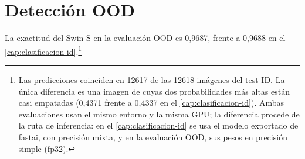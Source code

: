 %

\chapter{Detección OOD}\label{cap:deteccion-ood}


La exactitud del Swin-S en la evaluación OOD es 0,9687, frente a 0,9688 en el \cref{cap:clasificacion-id}.\footnote{Las predicciones coinciden en \num{12617} de las \num{12618} imágenes del test ID. La única diferencia es una imagen de  cuyas dos probabilidades más altas están casi empatadas (0,4371 frente a 0,4337 en el \cref{cap:clasificacion-id}). Ambas evaluaciones usan el mismo entorno y la misma GPU; la diferencia procede de la ruta de inferencia: en el \cref{cap:clasificacion-id} se usa el modelo exportado de fastai, con precisión mixta, y en la evaluación OOD, sus pesos en precisión simple (fp32).}


